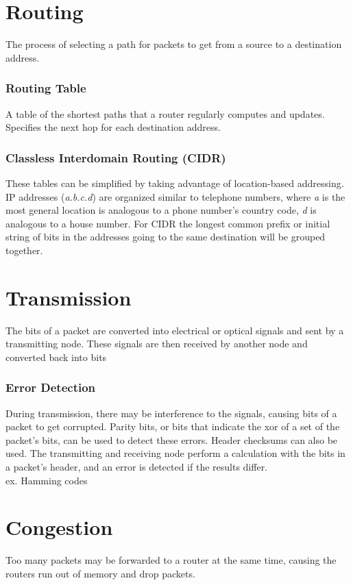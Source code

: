 \section{Routing}
The process of selecting a path for packets to get from a source to a destination address. 
\subsubsection*{Routing Table}
A table of the shortest paths that a router regularly computes and updates. Specifies the next hop for each destination address. 
\subsubsection*{Classless Interdomain Routing (CIDR)}
These tables can be simplified by taking advantage of location-based addressing. IP addresses (\textit{a.b.c.d}) are organized similar to telephone numbers, where \textit{a} is the most general location is analogous to a phone number's country code, \textit{d} is analogous to a house number. For CIDR the longest common prefix or initial string of bits in the addresses going to the same destination will be grouped together. 

\section{Transmission}
The bits of a packet are converted into electrical or optical signals and sent by a transmitting node. These signals are then received by another node and converted back into bits
\subsubsection*{Error Detection}
During transmission, there may be interference to the signals, causing bits of a packet to get corrupted. Parity bits, or bits that indicate the xor of a set of the packet's bits, can be used to detect these errors. Header checksums can also be used. The transmitting and receiving node perform a calculation with the bits in a packet's header, and an error is detected if the results differ. \\
ex. Hamming codes

\section{Congestion}
Too many packets may be forwarded to a router at the same time, causing the routers run out of memory and drop packets. 
